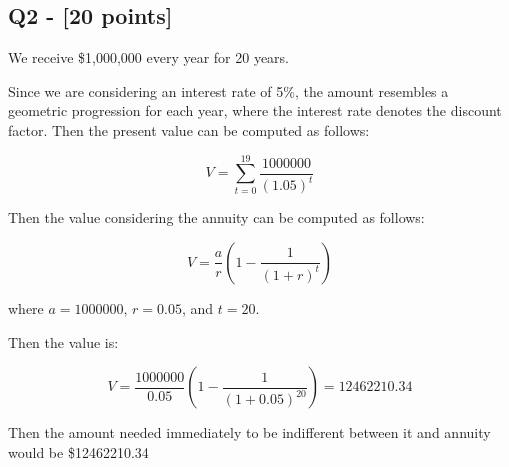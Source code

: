 \subsection*{Q2 - [20 points]}

\begin{solution}
We receive \$1,000,000 every year for 20 years. 

Since we are considering an interest rate of 5\%, the amount resembles a geometric progression for each year, where the interest rate denotes the discount factor. Then the present value can be computed as follows:

$$ V = \displaystyle\sum_{t = 0}^{19} \displaystyle\frac{1000000}{(1.05)^t} $$

Then the value considering the annuity can be computed as follows:

$$ V = \displaystyle\frac{a}{r}(1 - \displaystyle\frac{1}{(1 + r)^t})$$ 

where $a = 1000000$, $r = 0.05$, and $t = 20$.

Then the value is:

$$ V = \displaystyle\frac{1000000}{0.05}(1 - \displaystyle\frac{1}{(1 + 0.05)^{20}}) = 12462210.34 $$

Then the amount needed immediately to be indifferent between it and annuity would be \$12462210.34 
\end{solution}